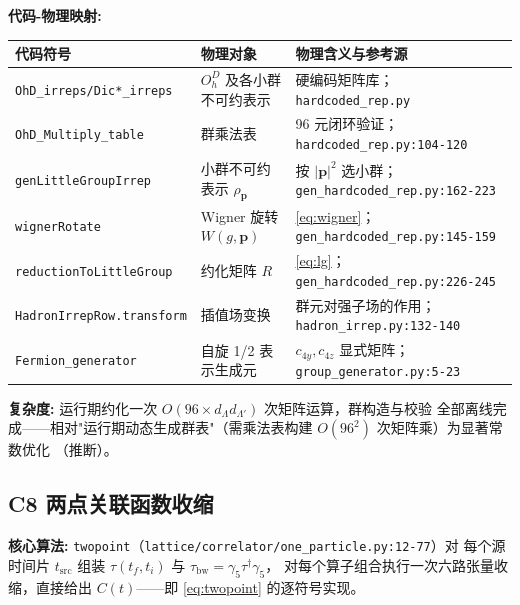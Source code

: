 \documentclass[UTF8]{ctexart}
\begin{document}
\begin{mapbox}
\textbf{代码-物理映射:}
\end{mapbox}
\begin{xltabular}{\textwidth}{llX}
\toprule
\textcolor{map}{代码符号} & 物理对象 & 物理含义与参考源 \\
\midrule
\endhead
\texttt{OhD\_irreps/Dic*\_irreps} & $O_h^D$ 及各小群不可约表示 & 硬编码矩阵库；
  \texttt{\nolinkurl{hardcoded_rep.py}} \\
\texttt{OhD\_Multiply\_table} & 群乘法表 & 96 元闭环验证；
  \texttt{\nolinkurl{hardcoded_rep.py:104-120}} \\
\texttt{genLittleGroupIrrep} & 小群不可约表示 $\rho_{\mathbf p}$ & 按 $|\mathbf p|^2$ 选小群；
  \texttt{\nolinkurl{gen_hardcoded_rep.py:162-223}} \\
\texttt{wignerRotate} & Wigner 旋转 $W(g,\mathbf p)$ & \eqref{eq:wigner}；
  \texttt{\nolinkurl{gen_hardcoded_rep.py:145-159}} \\
\texttt{reductionToLittleGroup} & 约化矩阵 $R$ & \eqref{eq:lg}；
  \texttt{\nolinkurl{gen_hardcoded_rep.py:226-245}} \\
\texttt{HadronIrrepRow.transform} & 插值场变换 & 群元对强子场的作用；
  \texttt{\nolinkurl{hadron_irrep.py:132-140}} \\
\texttt{Fermion\_generator} & 自旋 1/2 表示生成元 & $c_{4y}, c_{4z}$ 显式矩阵；
  \texttt{\nolinkurl{group_generator.py:5-23}} \\
\bottomrule
\end{xltabular}

\textbf{复杂度:} 运行期约化一次 $O(96 \times d_\Lambda d_{\Lambda'})$ 次矩阵运算，群构造与校验
全部离线完成——相对"运行期动态生成群表"（需乘法表构建 $O(96^2)$ 次矩阵乘）为显著常数优化
（推断）。

\subsection{C8 两点关联函数收缩}
\label{sec:c8}

\begin{algobox}
\textbf{核心算法:} \texttt{twopoint}（\texttt{lattice/correlator/one\_particle.py:12-77}）对
每个源时间片 $t_{\text{src}}$ 组装 $\tau(t_f,t_i)$ 与 $\tau_{\mathrm{bw}}=\gamma_5\tau^\dagger\gamma_5$，
对每个算子组合执行一次六路张量收缩，直接给出 $C(t)$——即 \eqref{eq:twopoint} 的逐符号实现。
\end{algobox}

\end{document}
